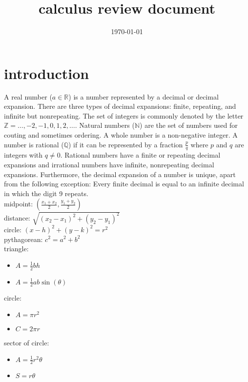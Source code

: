 \documentclass{article}
\title{calculus review document}
\date{\today}
\begin{document}
\maketitle

\section*{introduction}

	A real number ($a \in \mathbb{R}$) is a number represented by a decimal or decimal expansion. There are three types of decimal expansions: finite, repeating, and infinite but nonrepeating. The set of integers is commonly denoted by the letter $\mathbb{Z} = {\dots, -2, -1, 0, 1 , 2, \dots}$. Natural numbers ($\mathbb{N}$) are the set of numbers used for couting and sometimes ordering. A whole number is a non-negative integer. A number is rational ($\mathbb{Q}$) if it can be represented by a fraction $\frac{p}{q}$ where $p$ and $q$ are integers with $q \neq 0$. Rational numbers have a finite or repeating decimal expansions and irrational numbers have infinite, nonrepeating decimal expansions. Furthermore, the decimal expansion of a number is unique, apart from the following exception: Every finite decimal is equal to an infinite decimal in which the digit 9 repeats.\\

	midpoint: $(\frac{x_1 + x_2}{2}, \frac{y_1 + y_2}{2})$\\
	distance: $\sqrt{(x_2 - x_1)^2 + (y_2 - y_1)^2}$\\
	circle: $(x - h)^2 + (y - k)^2 = r^2$\\
	pythagorean: $c^2 = a^2 + b^2$\\

	triangle:
		\begin{itemize}
			\item $A = \frac{1}{2}bh$
			\item $A = \frac{1}{2}ab\sin(\theta)$
		\end{itemize}

	circle:
		\begin{itemize}
			\item $A = \pi r^2$
			\item $C = 2\pi r$
		\end{itemize}

	sector of circle:
		\begin{itemize}
			\item $A = \frac{1}{2}r^2\theta$
			\item $S = r\theta$
		\end{itemize}
\end{document}
